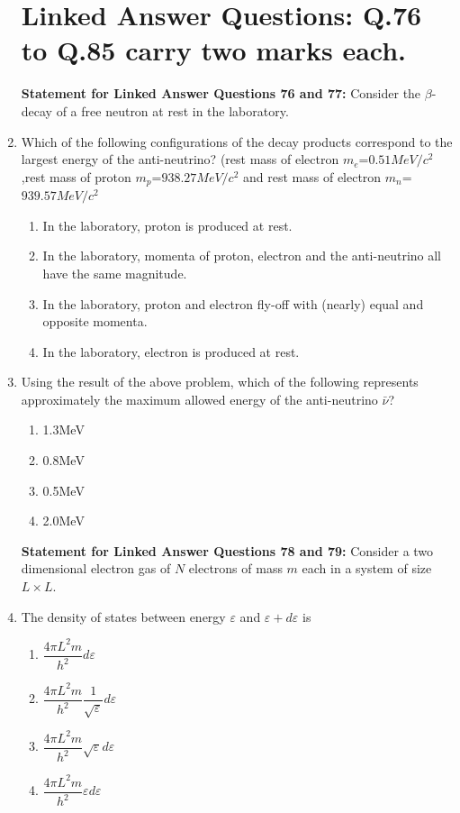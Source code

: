 \documentclass[journal,12pt,onecolumn]{IEEEtran}
\theoremstyle{remark}
\begin{document}
\begin{enumerate}
\section* {Linked Answer Questions: Q.76 to Q.85 carry two marks each.}
\vspace{0.5 mm}
\textbf{Statement for Linked Answer Questions 76 and 77:} 
Consider the $\beta$-decay of a free neutron at rest in the laboratory.
\vspace{0.25 mm}
        \item Which of the following configurations of the decay products correspond to the largest energy of the anti-neutrino? (rest mass of electron $m_e$=$0.51MeV/{c^2}$,rest mass of proton $m_p$=$938.27MeV/{c^2}$ and rest mass of electron $m_n$=$939.57MeV/{c^2}$

\begin{enumerate}
    \item In the laboratory, proton is produced at rest.
    \item In the laboratory, momenta of proton, electron and the anti-neutrino all have the same magnitude.
    \item In the laboratory, proton and electron fly-off with (nearly) equal and opposite momenta.
    \item In the laboratory, electron is produced at rest.
\end{enumerate}


        \item Using the result of the above problem, which of the    following  represents approximately the maximum allowed energy of the anti-neutrino {$\bar\nu$}?
        \hfill{}
\begin{multicols}{4}
\begin{enumerate}
    \item 1.3{MeV}
    \item 0.8{MeV}
    \item 0.5{MeV}
    \item 2.0{MeV}
\end{enumerate}
\end{multicols}
\vspace{0.5 mm}
\textbf{Statement for Linked Answer Questions 78 and 79:} 
Consider a two dimensional electron gas of \(N\) electrons of mass \(m\) each in a system of size $L \times L$.
\vspace{0.25 mm}

\item The density of states between energy $\varepsilon$ and $\varepsilon + d\varepsilon$ is
\hfill{}
\begin{multicols}{4}
\begin{enumerate}
    \item $\dfrac{4\pi L^2 m}{h^2}d\varepsilon$
    \item $\dfrac{4\pi L^2 m}{h^2}\dfrac{1}{\sqrt{\varepsilon}}d\varepsilon$
    \item $\dfrac{4\pi L^2 m}{h^2}\sqrt{\varepsilon}d\varepsilon$
    \item $\dfrac{4\pi L^2 m}{h^2}\varepsilon d\varepsilon$
\end{enumerate}
\end{multicols}


\end{enumerate}
\end{document}
